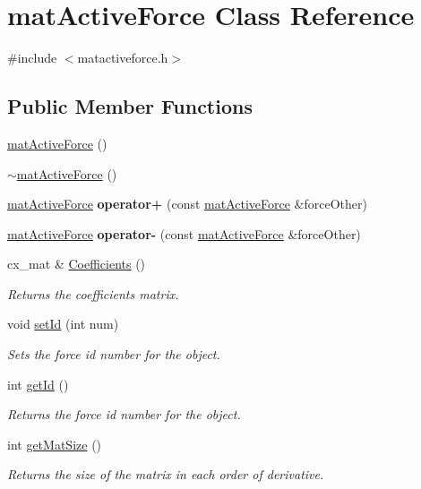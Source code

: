 \hypertarget{classmat_active_force}{\section{mat\-Active\-Force Class Reference}
\label{classmat_active_force}
}


{\ttfamily \#include $<$matactiveforce.\-h$>$}

\subsection*{Public Member Functions}
\begin{DoxyCompactItemize}
\item 
\hyperlink{classmat_active_force_a54cf53622c0704794cce57e5e2bf4778}{mat\-Active\-Force} ()
\item 
\hyperlink{classmat_active_force_aee61f8fd09276f17947adbb266de05a4}{$\sim$mat\-Active\-Force} ()
\item 
\hypertarget{classmat_active_force_a1c47a1b00dc16fbafb551510919fdeba}{\hyperlink{classmat_active_force}{mat\-Active\-Force} {\bfseries operator+} (const \hyperlink{classmat_active_force}{mat\-Active\-Force} \&force\-Other)}\label{classmat_active_force_a1c47a1b00dc16fbafb551510919fdeba}

\item 
\hypertarget{classmat_active_force_ad4691f97653f3ce814df4d4f9afc4c59}{\hyperlink{classmat_active_force}{mat\-Active\-Force} {\bfseries operator-\/} (const \hyperlink{classmat_active_force}{mat\-Active\-Force} \&force\-Other)}\label{classmat_active_force_ad4691f97653f3ce814df4d4f9afc4c59}

\item 
cx\-\_\-mat \& \hyperlink{classmat_active_force_a56526b6497fc513d211526584db50470}{Coefficients} ()
\begin{DoxyCompactList}\small\item\em Returns the coefficients matrix. \end{DoxyCompactList}\item 
void \hyperlink{classmat_active_force_afb097b17026a4ebe4f1f9567778a7c33}{set\-Id} (int num)
\begin{DoxyCompactList}\small\item\em Sets the force id number for the object. \end{DoxyCompactList}\item 
int \hyperlink{classmat_active_force_a0c60888b6547182a7c5ef89a9dc667e1}{get\-Id} ()
\begin{DoxyCompactList}\small\item\em Returns the force id number for the object. \end{DoxyCompactList}\item 
int \hyperlink{classmat_active_force_aef428f04d3a5f532f0d7c49e62019256}{get\-Mat\-Size} ()
\begin{DoxyCompactList}\small\item\em Returns the size of the matrix in each order of derivative. \end{DoxyCompactList}\end{DoxyCompactItemize}


